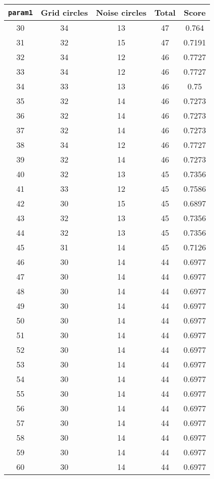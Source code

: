 \documentclass[letterpaper, 12pt]{article}
\begin{document}
\begin{longtable}{|c|c|c|c|c|}
\hline
\textbf{\texttt{param1}} & \textbf{Grid circles} & \textbf{Noise circles} & \textbf{Total} & \textbf{Score} \\
\hline
30 & 34 & 13 & 47 & 0.764 \\
\hline
31 & 32 & 15 & 47 & 0.7191 \\
\hline
32 & 34 & 12 & 46 & 0.7727 \\
\hline
33 & 34 & 12 & 46 & 0.7727 \\
\hline
34 & 33 & 13 & 46 & 0.75 \\
\hline
35 & 32 & 14 & 46 & 0.7273 \\
\hline
36 & 32 & 14 & 46 & 0.7273 \\
\hline
37 & 32 & 14 & 46 & 0.7273 \\
\hline
38 & 34 & 12 & 46 & 0.7727 \\
\hline
39 & 32 & 14 & 46 & 0.7273 \\
\hline
40 & 32 & 13 & 45 & 0.7356 \\
\hline
41 & 33 & 12 & 45 & 0.7586 \\
\hline
42 & 30 & 15 & 45 & 0.6897 \\
\hline
43 & 32 & 13 & 45 & 0.7356 \\
\hline
44 & 32 & 13 & 45 & 0.7356 \\
\hline
45 & 31 & 14 & 45 & 0.7126 \\
\hline
46 & 30 & 14 & 44 & 0.6977 \\
\hline
47 & 30 & 14 & 44 & 0.6977 \\
\hline
48 & 30 & 14 & 44 & 0.6977 \\
\hline
49 & 30 & 14 & 44 & 0.6977 \\
\hline
50 & 30 & 14 & 44 & 0.6977 \\
\hline
51 & 30 & 14 & 44 & 0.6977 \\
\hline
52 & 30 & 14 & 44 & 0.6977 \\
\hline
53 & 30 & 14 & 44 & 0.6977 \\
\hline
54 & 30 & 14 & 44 & 0.6977 \\
\hline
55 & 30 & 14 & 44 & 0.6977 \\
\hline
56 & 30 & 14 & 44 & 0.6977 \\
\hline
57 & 30 & 14 & 44 & 0.6977 \\
\hline
58 & 30 & 14 & 44 & 0.6977 \\
\hline
59 & 30 & 14 & 44 & 0.6977 \\
\hline
60 & 30 & 14 & 44 & 0.6977 \\

\end{longtable}
\end{document}
